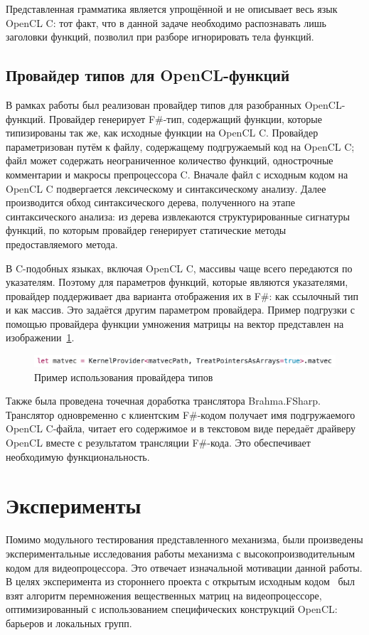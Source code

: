 Представленная грамматика является упрощённой и не описывает весь язык OpenCL C: тот факт, что в данной задаче необходимо распознавать лишь заголовки функций, позволил при разборе игнорировать тела функций.

\subsection{Провайдер типов для OpenCL-функций}
В рамках работы был реализован провайдер типов для разобранных OpenCL-функций. Провайдер генерирует F\#-тип, содержащий функции, которые типизированы так же, как исходные функции на OpenCL C. Провайдер параметризован путём к файлу, содержащему подгружаемый код на OpenCL C; файл может содержать неограниченное количество функций, однострочные комментарии и макросы препроцессора C. Вначале файл с исходным кодом на OpenCL C подвергается лексическому и синтаксическому анализу. Далее производится обход синтаксического дерева, полученного на этапе синтаксического анализа: из дерева извлекаются структурированные сигнатуры функций, по которым провайдер генерирует статические методы предоставляемого метода.

В C-подобных языках, включая OpenCL C, массивы чаще всего передаются по указателям. Поэтому для параметров функций, которые являются указателями, провайдер поддерживает два варианта отображения их в F\#: как ссылочный тип и как массив. Это задаётся другим параметром провайдера. Пример подгрузки с помощью провайдера функции умножения матрицы на вектор представлен на изображении~\ref{tp_call_example}.

\begin{figure}[h]
\centering
\includegraphics[width=\textwidth]{Smirenko/courseworkpictures/tp-call.png}
\caption{Пример использования провайдера типов}
\label{tp_call_example}
\end{figure}

Также была проведена точечная доработка транслятора Brahma.FSharp. Транслятор одновременно с клиентским F\#-кодом получает имя подгружаемого OpenCL C-файла, читает его содержимое и в текстовом виде передаёт драйверу OpenCL вместе с результатом трансляции F\#-кода. Это обеспечивает необходимую функциональность.

\section{Эксперименты}
Помимо модульного тестирования представленного механизма, были произведены экспериментальные исследования работы механизма с высокопроизводительным кодом для видеопроцессора. Это отвечает изначальной мотивации данной работы. В целях эксперимента из стороннего проекта с открытым исходным кодом~\cite{MyGEMM} был взят алгоритм перемножения вещественных матриц на видеопроцессоре, оптимизированный с использованием специфических конструкций OpenCL: барьеров и локальных групп.

